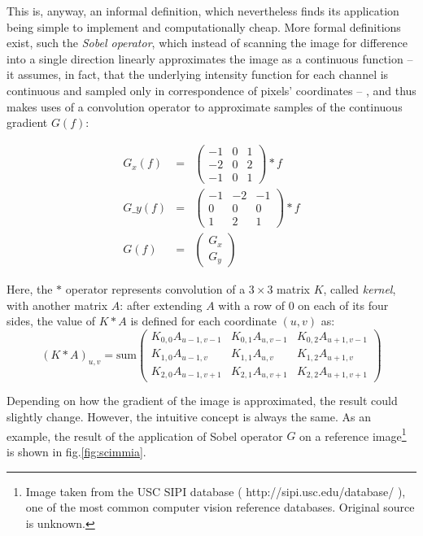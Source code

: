 This is, anyway, an informal definition, which nevertheless finds its
application being simple to implement and computationally cheap. More formal
definitions exist, such the \emph{Sobel operator}, which instead of scanning the
image for difference into a single direction linearly approximates the image as
a continuous function -- it assumes, in fact, that the underlying intensity
function for each channel is continuous
and sampled only in correspondence of pixels' coordinates -- , and thus makes
uses of a convolution operator to approximate samples of the continuous
gradient $G(f)$:

\begin{eqnarray}
  G_x(f) &=& \begin{pmatrix} 
      -1 & 0 & 1 \\
      -2 & 0 & 2 \\
      -1 & 0 & 1 \end{pmatrix}
  \ast f \\
  G\_y(f) &=& \begin{pmatrix} 
      -1 & -2 & -1 \\
      0 & 0 & 0 \\
      1 & 2 & 1 \end{pmatrix}
  \ast f  \\
  G(f) & = & \begin{pmatrix} G_x \\ G_y \end{pmatrix}
\end{eqnarray}

Here, the $\ast$ operator represents convolution of a $3\times 3$ matrix $K$, called
\emph{kernel}, with another matrix $A$: after extending $A$ with a row of $0$ on
each of its four sides, the value of $K\ast A$ is defined for each coordinate
$(u,v)$ as:
\begin{equation}
  (K \ast A)_{u,v} = \text{sum}\begin{pmatrix}
    K_{0,0}A_{u-1,v-1} & 
    K_{0,1}A_{u,v-1} & 
    K_{0,2}A_{u+1,v-1} \\ 
    K_{1,0}A_{u-1,v} & 
    K_{1,1}A_{u,v} & 
    K_{1,2}A_{u+1,v} \\ 
    K_{2,0}A_{u-1,v+1} & 
    K_{2,1}A_{u,v+1} & 
    K_{2,2}A_{u+1,v+1}  
  \end{pmatrix}
\end{equation}

Depending on how the gradient of the image is approximated, the result could
slightly change. However, the intuitive concept is always the same. As an
example, the result of the application of Sobel operator $G$ on a reference
image\footnote{Image taken from the USC SIPI database
  ( http://sipi.usc.edu/database/ ), one of the most common computer vision reference
databases. Original source is unknown.}
 is shown in fig.\ref{fig:scimmia}.

